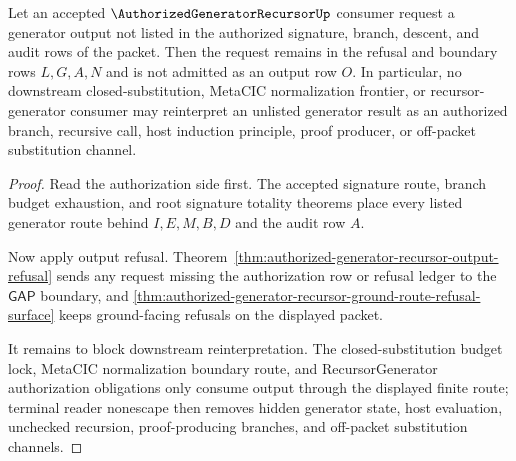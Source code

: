 \begin{theorem}
\label{thm:authorized-generator-recursor-route-refusal}
Let an accepted $\AuthorizedGeneratorRecursorUp$ consumer request a generator output not listed in the authorized signature, branch, descent, and audit rows of the packet. Then the request remains in the refusal and boundary rows $L,G,A,N$ and is not admitted as an output row $O$. In particular, no downstream closed-substitution, MetaCIC normalization frontier, or recursor-generator consumer may reinterpret an unlisted generator result as an authorized branch, recursive call, host induction principle, proof producer, or off-packet substitution channel.
\end{theorem}
\begin{proof}
Read the authorization side first. The accepted signature route, branch budget exhaustion, and root signature totality theorems place every listed generator route behind $I,E,M,B,D$ and the audit row $A$.

Now apply output refusal. Theorem~\ref{thm:authorized-generator-recursor-output-refusal} sends any request missing the authorization row or refusal ledger to the $\mathsf{GAP}$ boundary, and \autoref{thm:authorized-generator-recursor-ground-route-refusal-surface} keeps ground-facing refusals on the displayed packet.

It remains to block downstream reinterpretation. The closed-substitution budget lock, MetaCIC normalization boundary route, and RecursorGenerator authorization obligations only consume output through the displayed finite route; terminal reader nonescape then removes hidden generator state, host evaluation, unchecked recursion, proof-producing branches, and off-packet substitution channels.
\end{proof}

